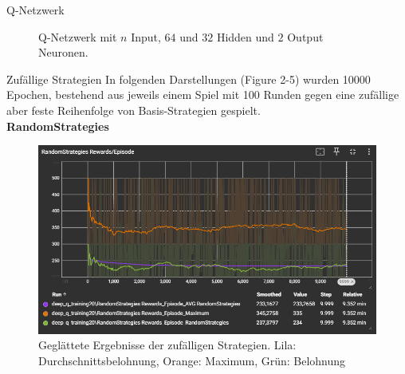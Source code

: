 \documentclass[final]{beamer}
\newlength{\colwidth}
\begin{document}
\begin{frame}[t]
\begin{columns}[t]
\begin{column}{\colwidth}
\begin{block}{Q-Netzwerk}
\begin{figure}[h]
\begin{tikzpicture}[x=5cm,y=1.6cm]
    \end{tikzpicture}
    \caption{Q-Netzwerk mit $n$ Input, $64$ und $32$ Hidden und $2$ Output Neuronen.}
    \end{figure}
    \end{block}


  
  \begin{block}{Zufällige Strategien}
    In folgenden Darstellungen (Figure 2-5) wurden 10000 Epochen, bestehend aus jeweils einem Spiel mit 100 Runden gegen eine zufällige aber 
    feste Reihenfolge von Basis-Strategien gespielt. \\
    \textbf{RandomStrategies}
    \begin{figure}[h]
      \centering
      \includegraphics[width=20cm]{logos/random_strategies.PNG}
      \caption{Geglättete Ergebnisse der zufälligen Strategien. Lila: Durchschnittsbelohnung, Orange: Maximum, Grün: Belohnung}
    \end{figure}
  \end{block}



\end{column}
\end{columns}
\end{frame}
\end{document}
